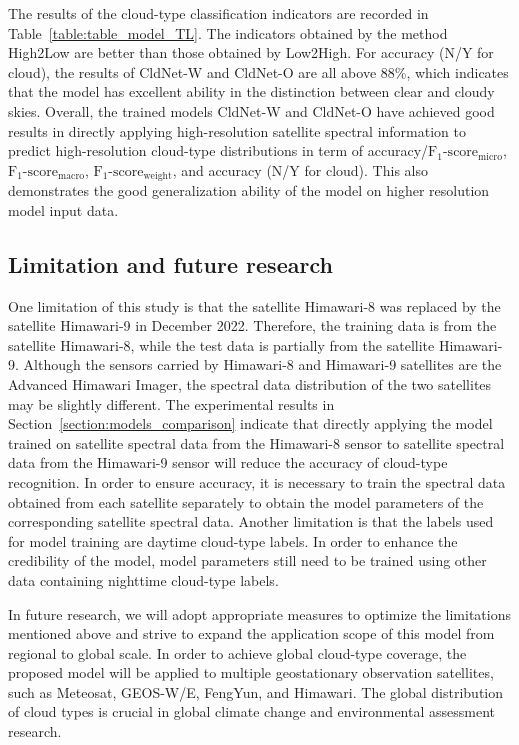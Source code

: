 \documentclass[review]{elsarticle}
\begin{document}
The results of the cloud-type classification indicators are recorded in Table~\ref{table:table_model_TL}.
The indicators obtained by the method High2Low are better than those obtained by Low2High.
For accuracy (N/Y for cloud), the results of CldNet-W and CldNet-O are all above 88\%, which indicates that the model has excellent ability in the distinction between clear and cloudy skies.
Overall, the trained models CldNet-W and CldNet-O have achieved good results in directly applying high-resolution satellite spectral information to predict high-resolution cloud-type distributions in term of accuracy/$\mathrm{F_{1}\mbox{-}score_{micro}}$, $\mathrm{F_{1}\mbox{-}score_{macro}}$, $\mathrm{F_{1}\mbox{-}score_{weight}}$, and accuracy (N/Y for cloud).
This also demonstrates the good generalization ability of the model on higher resolution model input data.



\subsection{Limitation and future research}
One limitation of this study is that the satellite Himawari-8 was replaced by the satellite Himawari-9 in December 2022. Therefore, the training data is from the satellite Himawari-8, while the test data is partially from the satellite Himawari-9.
Although the sensors carried by Himawari-8 and Himawari-9 satellites are the Advanced Himawari Imager, the spectral data distribution of the two satellites may be slightly different.
The experimental results in Section~\ref{section:models_comparison} indicate that directly applying the model trained on satellite spectral data from the Himawari-8 sensor to satellite spectral data from the Himawari-9 sensor will reduce the accuracy of cloud-type recognition.
In order to ensure accuracy, it is necessary to train the spectral data obtained from each satellite separately to obtain the model parameters of the corresponding satellite spectral data.
Another limitation is that the labels used for model training are daytime cloud-type labels.
In order to enhance the credibility of the model, model parameters still need to be trained using other data containing nighttime cloud-type labels.

In future research, we will adopt appropriate measures to optimize the limitations mentioned above and strive to expand the application scope of this model from regional to global scale. 
In order to achieve global cloud-type coverage, the proposed model will be applied to multiple geostationary observation satellites, such as Meteosat, GEOS-W/E, FengYun, and Himawari.
The global distribution of cloud types is crucial in global climate change and environmental assessment research.
\end{document}
